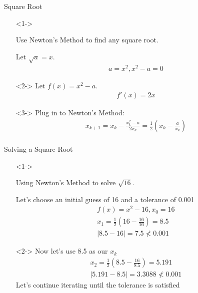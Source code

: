 \documentclass[aspectratio=169,xcolor=dvipsnames]{beamer}
\begin{document}
\begin{frame}{Square Root}
\begin{itemize}
    \item[]<1->
    \begin{center}
        Use Newton's Method to find any square root. \\
    \end{center}
    Let $\sqrt{a} = x$.
    \begin{gather*}
        a = x^2, x^2 - a = 0
    \end{gather*}
    \item[]<2->
    Let $f(x) = x^2 - a$.
    \begin{gather*}
        f'(x) = 2x
    \end{gather*}
    \item[]<3->
    Plug in to Newton's Method:
    \begin{gather*}
        x_{k+1} = x_k - \frac{x_k^2 - a}{2x_k} = \frac{1}{2} \left( x_k-\frac{a}{x_k} \right) \\
    \end{gather*}
\end{itemize}
\end{frame}

\begin{frame}{Solving a Square Root}
\begin{itemize}
\item[]<1->
    \begin{center}
        Using Newton's Method to solve $\sqrt{16}$. \vspace{0.3cm}
    \end{center}
    Let's choose an initial guess of 16 and a tolerance of 0.001
    \begin{gather*}
        f(x) = x^2 - 16, x_0 = 16 \\
        x_{1} = \frac{1}{2}\left( 16 - \frac{16}{16} \right) = 8.5 \\
        |8.5 - 16| = 7.5 \nless 0.001
    \end{gather*}
\item[]<2->
    Now let's use 8.5 as our $x_k$
    \begin{gather*}
        x_{2} = \frac{1}{2}\left( 8.5 - \frac{16}{8.5} \right) = 5.191 \\
        |5.191 - 8.5| = 3.3088 \nless 0.001
    \end{gather*}
    Let's continue iterating until the tolerance is satisfied
\end{itemize}
\end{frame}
\end{document}
